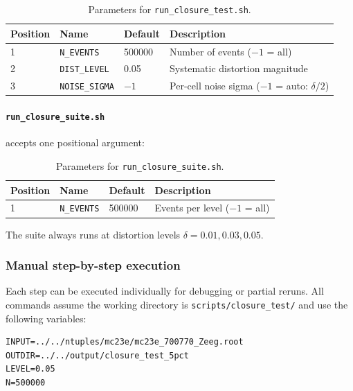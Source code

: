 \documentclass[12pt,a4paper]{article}
\begin{document}
\begin{table}[htbp]
\centering
\caption{Parameters for \texttt{run\_closure\_test.sh}.}
\label{tab:params:closure}
\begin{tabular}{llll}
\toprule
\textbf{Position} & \textbf{Name} & \textbf{Default} &
  \textbf{Description} \\
\midrule
1 & \texttt{N\_EVENTS} & 500000 & Number of events ($-1$ = all) \\
2 & \texttt{DIST\_LEVEL} & 0.05 & Systematic distortion magnitude \\
3 & \texttt{NOISE\_SIGMA} & $-1$ & Per-cell noise sigma
  ($-1$ = auto: $\delta/2$) \\
\bottomrule
\end{tabular}
\end{table}

\paragraph{\texttt{run\_closure\_suite.sh}} accepts one positional
argument:

\begin{table}[htbp]
\centering
\caption{Parameters for \texttt{run\_closure\_suite.sh}.}
\label{tab:params:suite}
\begin{tabular}{llll}
\toprule
\textbf{Position} & \textbf{Name} & \textbf{Default} &
  \textbf{Description} \\
\midrule
1 & \texttt{N\_EVENTS} & 500000 & Events per level ($-1$ = all) \\
\bottomrule
\end{tabular}
\end{table}

The suite always runs at distortion levels $\delta = 0.01, 0.03, 0.05$.

\subsubsection{Manual step-by-step execution}

Each step can be executed individually for debugging or partial reruns.
All commands assume the working directory is
\texttt{scripts/closure\_test/} and use the following variables:

\begin{lstlisting}
INPUT=../../ntuples/mc23e/mc23e_700770_Zeeg.root
OUTDIR=../../output/closure_test_5pct
LEVEL=0.05
N=500000
\end{lstlisting}
\end{document}
